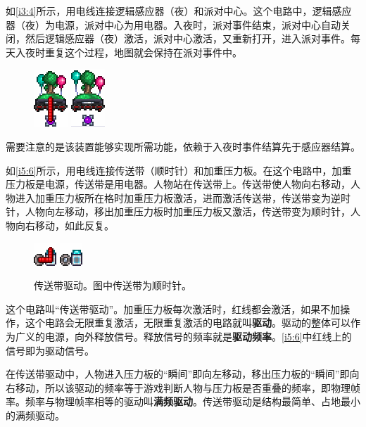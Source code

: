\begin{example}
如\autoref{i3:4}所示，用电线连接逻辑感应器（夜）和派对中心。这个电路中，逻辑感应器（夜）为电源，派对中心为用电器。入夜时，派对事件结束，派对中心自动关闭，然后逻辑感应器（夜）激活，派对中心激活，又重新打开，进入派对事件。每天入夜时重复这个过程，地图就会保持在派对事件中。
\begin{figure}[!ht]
\begin{center}
\includegraphics{images/3.png}
\qquad
\includegraphics{images/4.png}
\end{center}
\caption{}
\label{i3:4}
\end{figure}
\begin{remark}
需要注意的是该装置能够实现所需功能，依赖于入夜时事件结算先于感应器结算。
\end{remark}
\end{example}

\begin{example}[传送带驱动]

如\autoref{i5:6}所示，用电线连接传送带（顺时针）和加重压力板。在这个电路中，加重压力板是电源，传送带是用电器。人物站在传送带上。传送带使人物向右移动，人物进入加重压力板所在格时加重压力板激活，进而激活传送带，传送带变为逆时针，人物向左移动，移出加重压力板时加重压力板又激活，传送带变为顺时针，人物向右移动，如此反复。
\begin{figure}[!ht]
\begin{center}
\includegraphics{images/5.png}
\qquad
\includegraphics{images/6.png}
\end{center}
\caption{传送带驱动。图中传送带为顺时针。}
\label{i5:6}
\end{figure}

这个电路叫“传送带驱动”。加重压力板每次激活时，红线都会激活，如果不加操作，这个电路会无限重复激活，无限重复激活的电路就叫\textbf{驱动}。驱动的整体可以作为广义的电源，向外释放信号。释放信号的频率就是\textbf{驱动频率}。\autoref{i5:6}中红线上的信号即为驱动信号。

在传送带驱动中，人物进入压力板的“瞬间”即向左移动，移出压力板的“瞬间”即向右移动，所以该驱动的频率等于游戏判断人物与压力板是否重叠的频率，即物理帧率。频率与物理帧率相等的驱动叫\textbf{满频驱动}。传送带驱动是结构最简单、占地最小的满频驱动。
\end{example}

